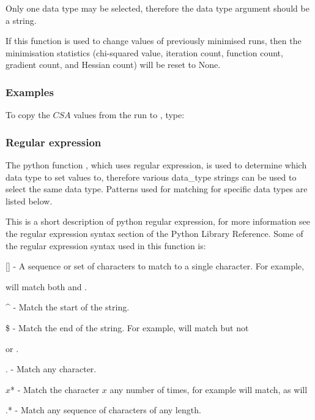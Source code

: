 Only one data type may be selected, therefore the data type argument should be a string.

If this function is used to change values of previously minimised runs, then the
minimisation statistics (chi-squared value, iteration count, function count, gradient count,
and Hessian count) will be reset to None.


\subsubsection{Examples}

To copy the $CSA$ values from the run 
 to 
, type:






\subsubsection{Regular expression}

The python function 
, which uses regular expression, is used to determine which data
type to set values to, therefore various data\_type strings can be used to select the same
data type.  Patterns used for matching for specific data types are listed below.

This is a short description of python regular expression, for more information see the
regular expression syntax section of the Python Library Reference.  Some of the regular
expression syntax used in this function is:

    [] - A sequence or set of characters to match to a single character.  For example,
    
 will match both 
 and 
.

    \^{} - Match the start of the string.

    \$ - Match the end of the string.  For example, 
 will match 
 but not 

    or 
.

    . - Match any character.

    $x$* - Match the character $x$ any number of times, for example 
 will match, as will
    


    .* - Match any sequence of characters of any length.

